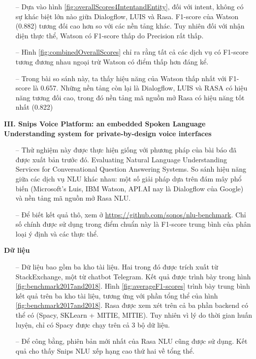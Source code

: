 \begin{itemize}
    \item[--] Dựa vào hình \ref{fig:overallScores4IntentandEntity}, đối với intent, không có sự khác biệt lớn nào giữa Dialogflow, LUIS và Rasa. F1-score của Watson (0.882) tương đối cao hơn so với các nền tảng khác. Tuy nhiên đối với nhận diện thực thể, Watson có F1-score thấp do Precision rất thấp.
    \item[--] Hình \ref{fig:combinedOverallScores} chỉ ra rằng tất cả các dịch vụ có F1-score tương đương nhau ngoại trừ Watson có điểm thấp hơn đáng kể.
    \item[--] Trong bài so sánh này, ta thấy hiệu năng của Watson thấp nhất với F1-score là 0.657. Những nền tảng còn lại là Dialogflow, LUIS và RASA có hiệu năng tương đối cao, trong đó nền tảng mã nguồn mở Rasa có hiệu năng tốt nhất (0.822)
\end{itemize}

\textbf{III. Snips Voice Platform: an embedded Spoken Language Understanding system for private-by-design voice interfaces}

\begin{itemize}
    \item[--] Thử nghiệm này được thực hiện giống với phương pháp của bài báo đã được xuất bản trước đó. Evaluating Natural Language Understanding Services for Conversational Question Answering Systems. So sánh hiệu năng giữa các dịch vụ NLU khác nhau: một số giải pháp dựa trên đám mây phổ biến (Microsoft’s Luis, IBM Watson, API.AI nay là Dialogflow của Google) và nền tảng mã nguồn mở Rasa NLU.
    \item[--] Để biết kết quả thô, xem ở \url{https://github.com/sonos/nlu-benchmark}. Chỉ số chính được sử dụng trong điểm chuẩn này là F1-score trung bình của phân loại ý định và các thực thể.
\end{itemize}

\textbf{Dữ liệu}
\begin{itemize}
    \item[--] Dữ liệu bao gồm ba kho tài liệu. Hai trong đó được trích xuất từ StackExchange, một từ chatbot Telegram. Kết quả được trình bày trong hình \ref{fig:benchmark2017and2018}. Hình \ref{fig:averageF1-scores} trình bày trung bình kết quả trên ba kho tài liệu, tương ứng với phần tổng thể của hình \ref{fig:benchmark2017and2018}. Rasa được xem xét trên cả ba phần backend có thể có (Spacy, SKLearn + MITIE, MITIE). Tuy nhiên vì lý do thời gian huấn luyện, chỉ có Spacy được chạy trên cả 3 bộ dữ liệu.
    \item[--] Để công bằng, phiên bản mới nhất của Rasa NLU cũng được sử dụng. Kết quả cho thấy Snips NLU xếp hạng cao thứ hai về tổng thể.
\end{itemize}

